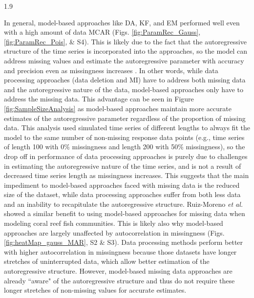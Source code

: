 \documentclass[12pt,english]{article} %
\begin{document}
\begin{linenumbers}
\begin{spacing}{1.9}
\begin{flushleft}
\hspace{1em} In general, model-based approaches like DA, KF, and EM performed well even with a high amount of data MCAR (Figs. \ref{fig:ParamRec_Gauss}, \ref{fig:ParamRec_Pois}, \& S4). This is likely due to the fact that the autoregressive structure of the time series is incorporated into the approaches, so the model can address missing values and estimate the autoregressive parameter with accuracy and precision even as missingness increases \citep{kalman_filter_1960, kang2013prevention, kong_sequential_1994}. In other words, while data processing approaches (data deletion and MI) have to address both missing data and the autoregressive nature of the data, model-based approaches only have to address the missing data. This advantage can be seen in Figure \ref{fig:SampleSizeAnalysis} as model-based approaches maintain more accurate estimates of the autoregressive parameter regardless of the proportion of missing data. This analysis used simulated time series of different lengths to always fit the model to the same number of non-missing response data points (e.g., time series of length 100 with 0\% missingness and length 200 with 50\% missingness), so the drop off in performance of data processing approaches is purely due to challenges in estimating the autoregressive nature of the time series, and is not a result of decreased time series length as missingness increases. This suggests that the main impediment to model-based approaches faced with missing data is the reduced size of the dataset, while data processing approaches suffer from both less data and an inability to recapitulate the autoregressive structure. Ruiz-Moreno \textit{et al.} \citeyear{ruiz2025longer} showed a similar benefit to using model-based approaches for missing data when modeling coral reef fish communities. This is likely also why model-based approaches are largely unaffected by autocorrelation in missingness (Figs. \ref{fig:heatMap_gauss_MAR}, S2 \& S3). Data processing methods perform better with higher autocorrelation in missingness because those datasets have longer stretches of uninterrupted data, which allow better estimation of the autoregressive structure. However, model-based missing data approaches are already ``aware" of the autoregressive structure and thus do not require these longer stretches of non-missing values for accurate estimates.


\end{flushleft}
\end{spacing}
\end{linenumbers}
\end{document}
